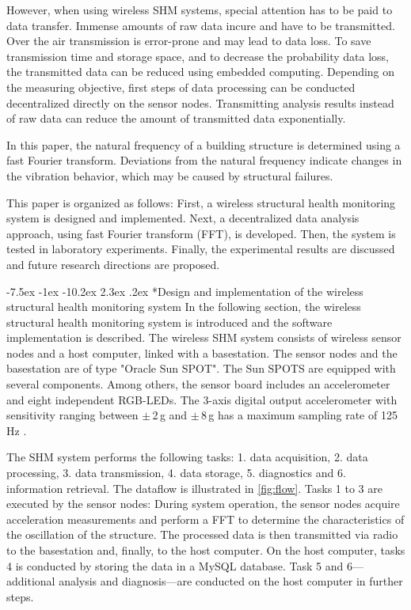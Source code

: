 \documentclass[12pt,a4paper]{scrartcl}
\makeatletter
\renewcommand\section{\@startsection{section}{1}{\z@}%
                     {-7.5ex \@plus -1ex \@minus -10.2ex}%
                     {2.3ex \@plus.2ex}%
                     {\sffamily\large\bfseries}}
\makeatother
\begin{document}
However, when using wireless SHM systems, special attention has to be paid to data transfer.
Immense amounts of raw data incure and have to be transmitted.
Over the air transmission is error-prone and may lead to data loss.
To save transmission time and storage space, and to decrease the probability data loss, the transmitted data can be reduced using embedded computing.
Depending on the measuring objective, first steps of data processing can be conducted decentralized directly on the sensor nodes.
Transmitting analysis results instead of raw data can reduce the amount of transmitted data exponentially.

In this paper, the natural frequency of a building structure is determined using a fast Fourier transform.
Deviations from the natural frequency indicate changes in the vibration behavior, which may be caused by structural failures.

This paper is organized as follows:
First, a wireless structural health monitoring system is designed and implemented. 
Next, a decentralized data analysis approach, using fast Fourier transform (FFT), is developed.
Then, the system is tested in laboratory experiments.
Finally, the experimental results are discussed and future research directions are proposed.


\section*{Design and implementation of the wireless structural health monitoring system}
In the following section, the wireless structural health monitoring system is introduced and the software implementation is described.
The wireless SHM system consists of wireless sensor nodes and a host computer, linked with a basestation.
The sensor nodes and the basestation are of type "Oracle Sun SPOT". 
The Sun SPOTS are equipped with several components.
Among others, the sensor board includes an accelerometer and eight independent RGB-LEDs.
The 3-axis digital output accelerometer with sensitivity ranging between $\pm$\,2\,g and $\pm$\,8\,g has a maximum sampling rate of 125\,Hz \citep{eDemo2010}.

The SHM system performs the following tasks:
1. data acquisition,
2. data processing,
3. data transmission, 
4. data storage,
5. diagnostics and 
6. information retrieval.
The dataflow is illustrated in \autoref{fig:flow}.
Tasks 1 to 3 are executed by the sensor nodes: During system operation, the sensor nodes acquire acceleration measurements and perform a FFT to determine the characteristics of the oscillation of the structure. 
The processed data is then transmitted via radio to the basestation and, finally, to the host computer.
On the host computer, tasks 4 is conducted by storing the data in a MySQL database.
Task 5 and 6---additional analysis and diagnosis---are conducted on the host computer in further steps.
\end{document}
